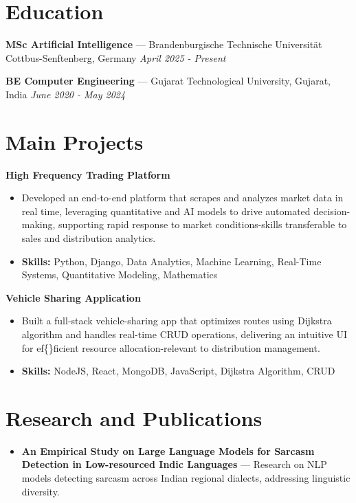 \documentclass[a4paper,10pt]{article}
\begin{document}
\section*{Education}
\textbf{MSc Artificial Intelligence} — Brandenburgische Technische Universität Cottbus-Senftenberg, Germany \hfill \textit{April 2025 - Present}\par
\vspace{1.5pt}
\textbf{BE Computer Engineering} — Gujarat Technological University, Gujarat, India \hfill \textit{June 2020 - May 2024}\par

\section*{Main Projects}
\textbf{High Frequency Trading Platform}\par
\vspace{1pt}
\begin{itemize}
  \item Developed an end-to-end platform that scrapes and analyzes market data in real time, leveraging quantitative and AI models to drive automated decision-making, supporting rapid response to market conditions-skills transferable to sales and distribution analytics.
  \item \textbf{Skills:} Python, Django, Data Analytics, Machine Learning, Real-Time Systems, Quantitative Modeling, Mathematics
\end{itemize}
\vspace{3pt}
\textbf{Vehicle Sharing Application}\par
\vspace{1pt}
\begin{itemize}
  \item Built a full-stack vehicle-sharing app that optimizes routes using Dijkstra algorithm and handles real-time CRUD operations, delivering an intuitive UI for ef\{\}ficient resource allocation-relevant to distribution management.
  \item \textbf{Skills:} NodeJS, React, MongoDB, JavaScript, Dijkstra Algorithm, CRUD
\end{itemize}

\section*{Research and Publications}
\begin{itemize}
\item \textbf{An Empirical Study on Large Language Models for Sarcasm Detection in Low-resourced Indic Languages} — Research on NLP models detecting sarcasm across Indian regional dialects, addressing linguistic diversity.
\end{itemize}
\end{document}
